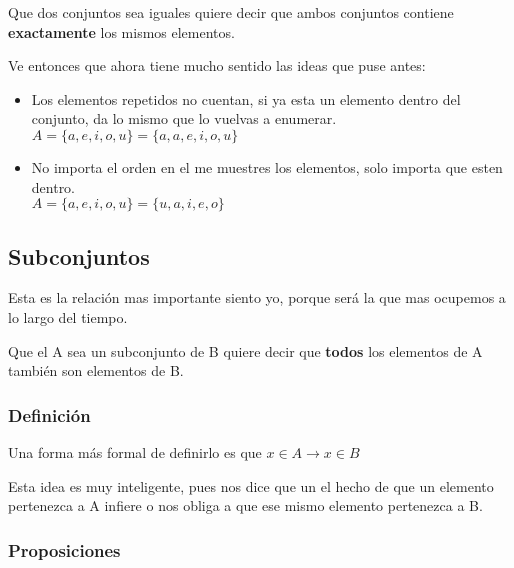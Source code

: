 \documentclass[12pt]{report}                                    %
\begin{document}
            Que dos conjuntos sea iguales quiere decir que ambos conjuntos contiene \textbf{exactamente}
            los mismos elementos.

            Ve entonces que ahora tiene mucho sentido las ideas que puse antes:

            \begin{itemize}
                \item Los elementos repetidos no cuentan, si ya esta un elemento dentro del
                    conjunto, da lo mismo que lo vuelvas a enumerar.\\
                    $A = \{a, e, i, o, u\} = \{a, a, e, i, o, u\}$

                \item No importa el orden en el me muestres los elementos,
                    solo importa que esten dentro.\\
                    $A = \{a, e, i, o, u\} = \{u, a, i, e, o\}$
            \end{itemize}


        \clearpage
        \subsection{Subconjuntos}

            Esta es la relación mas importante siento yo, porque será la que mas ocupemos a lo largo
            del tiempo.

            Que el A sea un subconjunto de B quiere decir que \textbf{todos} los elementos de A
            también son elementos de B.

            \subsubsection{Definición}

                Una forma más formal de definirlo es que $x \in A \to x \in B$

                Esta idea es muy inteligente, pues nos dice que un el hecho de que
                un elemento pertenezca a A infiere o nos obliga a que ese mismo
                elemento pertenezca a B.


            \subsubsection{Proposiciones}
\end{document}
